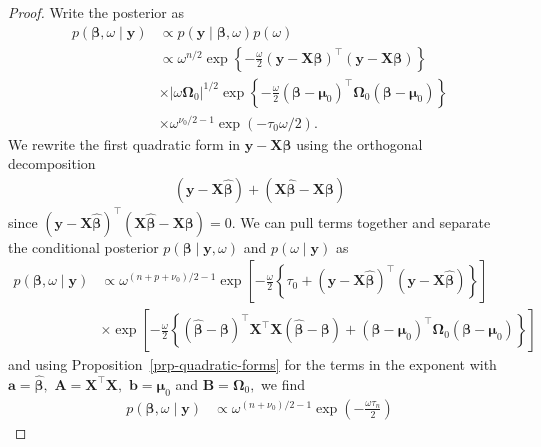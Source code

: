 \documentclass[
  11pt,
  letterpaper,
]{scrbook}
\theoremstyle{definition}
\theoremstyle{plain}
\theoremstyle{plain}
\theoremstyle{plain}
\theoremstyle{definition}
\theoremstyle{definition}
\theoremstyle{plain}
\theoremstyle{plain}
\theoremstyle{remark}
\begin{document}
\begin{proof}
Write the posterior as \begin{align*}
 p(\boldsymbol{\beta}, \omega \mid \boldsymbol{y}) &\propto p(\boldsymbol{y} \mid \boldsymbol{\beta}, \omega) p(\omega)
 \\& \propto  \omega^{n/2} \exp\left\{-\frac{\omega}{2}(\boldsymbol{y}-\mathbf{X}\boldsymbol{\beta})^\top(\boldsymbol{y}-\mathbf{X}\boldsymbol{\beta})\right\}\\& \times |\omega\boldsymbol{\Omega}_0|^{1/2}\exp \left\{ -\frac{\omega}{2} (\boldsymbol{\beta}-\boldsymbol{\mu}_0)^\top\boldsymbol{\Omega}_0(\boldsymbol{\beta}-\boldsymbol{\mu}_0)\right\} \\& \times \omega^{\nu_0/2-1}\exp\left(-\tau_0\omega/2\right).
\end{align*} We rewrite the first quadratic form in
\(\boldsymbol{y}-\mathbf{X}\boldsymbol{\beta}\) using the orthogonal
decomposition \begin{align*}
 (\boldsymbol{y}-\mathbf{X}\widehat{\boldsymbol{\beta}}) + (\mathbf{X}\widehat{\boldsymbol{\beta}} - \mathbf{X}\boldsymbol{\beta})
\end{align*} since
\((\boldsymbol{y}-\mathbf{X}\widehat{\boldsymbol{\beta}})^\top (\mathbf{X}\widehat{\boldsymbol{\beta}} - \mathbf{X}\boldsymbol{\beta}) = 0.\)
We can pull terms together and separate the conditional posterior
\(p(\boldsymbol{\beta} \mid \boldsymbol{y}, \omega)\) and
\(p(\omega \mid \boldsymbol{y})\) as \begin{align*}
 p(\boldsymbol{\beta}, \omega \mid \boldsymbol{y}) &\propto \omega^{(n+p+\nu_0)/2 -1} \exp\left[-\frac{\omega}{2}\left\{\tau_0 + (\boldsymbol{y}-\mathbf{X}\widehat{\boldsymbol{\beta}})^\top(\boldsymbol{y}-\mathbf{X}\widehat{\boldsymbol{\beta}})\right\}\right]
 \\& \times \exp \left[-\frac{\omega}{2}\left\{(\widehat{\boldsymbol{\beta}} - \boldsymbol{\beta})^\top\mathbf{X}^\top\mathbf{X}(\widehat{\boldsymbol{\beta}} - \boldsymbol{\beta})+ (\boldsymbol{\beta}-\boldsymbol{\mu}_0)^\top\boldsymbol{\Omega}_0(\boldsymbol{\beta}-\boldsymbol{\mu}_0)\right\}\right]
\end{align*} and using Proposition~\ref{prp-quadratic-forms} for the
terms in the exponent with
\(\boldsymbol{a} = \widehat{\boldsymbol{\beta}},\)
\(\mathbf{A}=\mathbf{X}^\top\mathbf{X},\)
\(\boldsymbol{b} = \boldsymbol{\mu}_0\) and
\(\mathbf{B}=\boldsymbol{\Omega}_0,\) we find \begin{align*}
  p(\boldsymbol{\beta}, \omega \mid \boldsymbol{y}) & \propto
   \omega^{(n+\nu_0)/2 -1} \exp\left(-\frac{\omega\tau_n}{2}\right)

\end{align*}
\end{proof}
\end{document}
